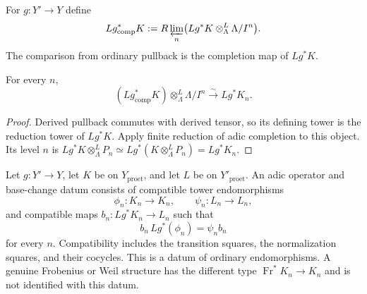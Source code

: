 \begin{definition}
\label{def:weil-pbc-completed-pullback}
For $g:Y'\to Y$ define
\[
 Lg^*_{\mathrm{comp}}K:=
 R\varprojlim_n\bigl(Lg^*K\otimes^L_\Lambda\Lambda/I^n\bigr).
\]
The comparison from ordinary pullback is the completion map of $Lg^*K$.
\end{definition}

\begin{lemma}
\label{lemma:weil-pbc-completed-pullback-reduction}
For every $n$,
\[
 (Lg^*_{\mathrm{comp}}K)\otimes^L_\Lambda\Lambda/I^n
 \xrightarrow{\sim}Lg^*K_n.
\]
\end{lemma}
\begin{proof}

Derived pullback commutes with derived tensor, so its defining tower is the
reduction tower of $Lg^*K$.  Apply finite reduction of adic completion to
this object.  Its level $n$ is
$Lg^*K\otimes^L_\Lambda P_n\simeq Lg^*(K\otimes^L_\Lambda P_n)=Lg^*K_n$.
\end{proof}

\begin{definition}
\label{def:weil-pbc-adic-operator-base-change-datum}
Let $g:Y'\to Y$, let $K$ be on $Y_{\mathrm{proet}}$, and let $L$ be on
$Y'_{\mathrm{proet}}$.  An adic operator and base-change datum consists of
compatible tower endomorphisms
\[
 \phi_n:K_n\to K_n,\qquad \psi_n:L_n\to L_n,
\]
and compatible maps $b_n:Lg^*K_n\to L_n$ such that
\[
 b_n\,Lg^*(\phi_n)=\psi_n b_n
\]
for every $n$.  Compatibility includes the transition squares, the
normalization squares, and their cocycles.  This is a datum of ordinary
endomorphisms.  A genuine Frobenius or Weil structure has the different type
$\operatorname{Fr}^*K_n\to K_n$ and is not identified with this datum.
\end{definition}

